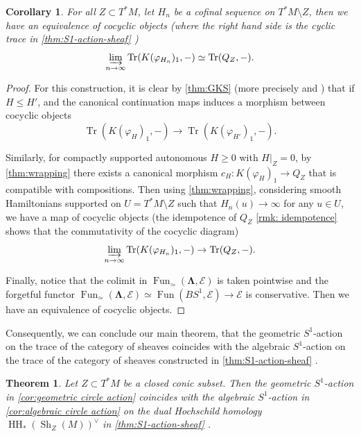 \documentclass[11pt]{amsart}
\numberwithin{equation}{section}
\theoremstyle{plain}
\newtheorem{Thm}{Theorem}[section]
\newtheorem{Coro}[coro]{Corollary}
\theoremstyle{definition}
\theoremstyle{remark}
\newcommand{\cE} { {\mathcal{E}}}
\newcommand{\Sh} { {\operatorname{Sh}}}
\newcommand\Fun{\operatorname{Fun}}
\newcommand\HH{\operatorname{HH}}
\newcommand\Tr{\operatorname{Tr}}
\begin{document}
\begin{Coro}\label{cor:algebraic circle action}
For all $Z\subset T^*M$, let $H_n$ be a cofinal sequence on $T^*M\setminus Z$, then we have an equivalence of cocyclic objects (where the right hand side is the cyclic trace in \autoref{thm:S1-action-sheaf} \cite[Theorem 1.1]{Li-Zhang26-1})
\[\varinjlim_{n\to \infty}\Tr(K(\varphi_{H_n})_1,-) \simeq \Tr(Q_Z,-).\]
\end{Coro}
\begin{proof}
For this construction, it is clear by \autoref{thm:GKS} (more precisely \cite[Remark 4.9]{GKS2012} and \cite[Proposition 3.9 \& Remark 3.10]{kuo2021wrapped}) that if $H\leq H'$, and the canonical continuation maps induces a morphism between cocyclic objects
\[\Tr(K(\varphi_{H})_1,-) \to \Tr(K(\varphi_{H'})_1,-).\]

Similarly, for compactly supported autonomous $H\geq 0$ with $H|_Z=0$, by \autoref{thm:wrapping} there exists a canonical morphism
\(c_H:K(\varphi_H)_1 \to Q_Z\)
that is compatible with compositions.
Then using \autoref{thm:wrapping}, considering smooth Hamiltonians supported on $U = T^*M \setminus Z$ such that $H_n(u) \to \infty$ for any $u \in U$, we have a map of cocyclic objects (the idempotence of $Q_Z$ \autoref{rmk: idempotence} shows that the commutativity of the cocyclic diagram)
\[\varinjlim_{n\to\infty}\Tr (K(\varphi_{H_n})_1,-)\to \Tr(Q_Z,-).\]

Finally, notice that the colimit in $\Fun_{\simeq}(\boldsymbol\Lambda,\cE)$ is taken pointwise and the forgetful functor $\Fun_{\simeq}(\boldsymbol\Lambda,\cE)\simeq \Fun(BS^1,\cE)\to \cE$ is conservative. Then we have an equivalence of cocyclic objects.
\end{proof}




Consequently, we can conclude our main theorem, that the geometric $S^1$-action on the trace of the category of sheaves coincides with the algebraic $S^1$-action on the trace of the category of sheaves constructed in \autoref{thm:S1-action-sheaf} \cite[Theorem 1.1]{Li-Zhang26-1}.

\begin{Thm}\label{thm:geometric algebraic action}
Let $Z \subset T^*M$ be a closed conic subset. Then the geometric $S^1$-action in \autoref{cor:geometric circle action} coincides with the algebraic $S^1$-action in \autoref{cor:algebraic circle action} on the dual Hochschild homology $\HH_*(\Sh_Z(M))^\vee$ in \autoref{thm:S1-action-sheaf} \cite[Theorem 1.1]{Li-Zhang26-1}.
\end{Thm}
\end{document}
